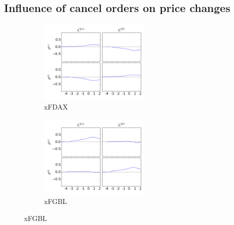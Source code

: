 \documentclass[a4paper,11pt]{article}
\begin{document}
\subsection{Influence of cancel orders on price changes}
\label{CP}
\begin{figure}[H]
        \begin{subfigure}[b]{0.45\textwidth}
                \includegraphics[width=\textwidth,height=40mm]{xFDAXPA_PB_TA_TB_LA_LB_CA_CB__CACB-_PAPBcausality.png}
                \caption{xFDAX}
        \end{subfigure}
        \begin{subfigure}[b]{0.45\textwidth}
                \includegraphics[width=\textwidth,height=40mm]{xFGBLPA_PB_TA_TB_LA_LB_CA_CB__CACB-_PAPBcausality.png}
                \caption{xFGBL}
        \end{subfigure}
\end{figure}
\end{document}
